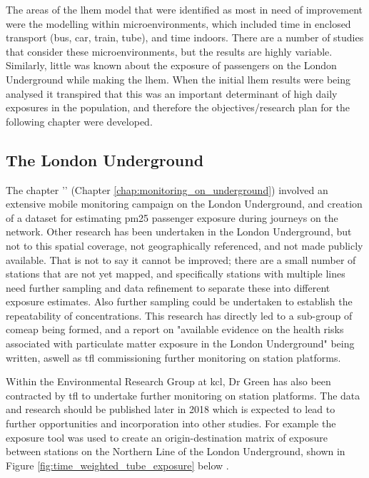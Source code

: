 The areas of the \gls{lhem} model that were identified as most in need of improvement were the modelling within microenvironments, which included time in enclosed transport (bus, car, train, tube), and time indoors. There are a number of studies that consider these microenvironments, but the results are highly variable. Similarly, little was known about the exposure of passengers on the London Underground while making the \gls{lhem}. When the initial \gls{lhem} results were being analysed it transpired that this was an important determinant of high daily exposures in the population, and therefore the objectives/research plan for the following chapter were developed.\\

\subsection{The London Underground}
\label{london_underground_wrapup}

The chapter '' (Chapter \ref{chap:monitoring_on_underground}) involved an extensive mobile monitoring campaign on the London Underground, and creation of a dataset for estimating \gls{pm25} passenger exposure during journeys on the network. Other research has been undertaken in the London Underground, but not to this spatial coverage, not geographically referenced, and not made publicly available. That is not to say it cannot be improved; there are a small number of stations that are not yet mapped, and specifically stations with multiple lines need further sampling and data refinement to separate these into different exposure estimates. Also further sampling could be undertaken to establish the repeatability of concentrations. This research has directly led to a sub-group of \gls{comeap} being formed, and a report on "available evidence on the health risks associated with particulate matter exposure in the London Underground" being written, aswell as \gls{tfl} commissioning further monitoring on station platforms.

Within the Environmental Research Group at \gls{kcl}, Dr Green has also been contracted by \gls{tfl} to undertake further monitoring on station platforms. The data and research should be published later in 2018 which is expected to lead to further opportunities and incorporation into other studies. For example the exposure tool was used to create an origin-destination matrix of exposure between stations on the Northern Line of the London Underground, shown in Figure \ref{fig:time_weighted_tube_exposure} below .

